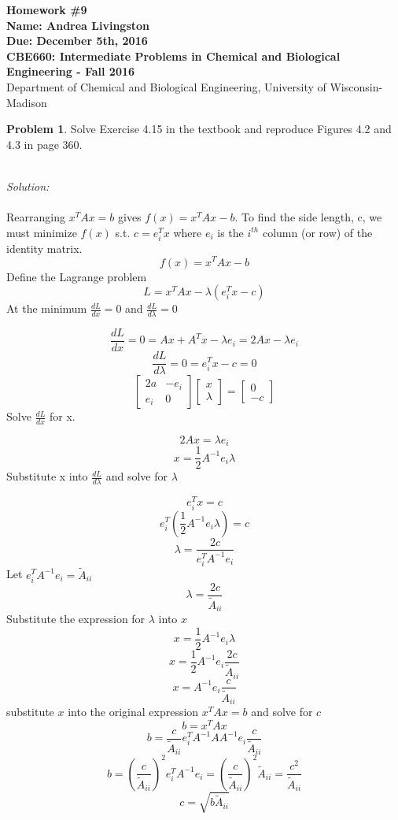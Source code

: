 \documentclass[10pt]{article}
\begin{document}
\begin{center}
{\Large\bf Homework \#9}\\
 {\bf Name: Andrea Livingston}\\
 {\bf Due: December 5th, 2016}\\
 {\bf CBE660: Intermediate Problems in Chemical and Biological
Engineering\; -\; Fall 2016}\\
Department of Chemical and Biological Engineering, University of Wisconsin-Madison
\end{center}

\noindent\colorbox{mygray}{\begin{minipage}{\textwidth}
  {\bf Problem 1}. Solve Exercise 4.15 in the textbook and reproduce Figures 4.2 and 4.3 in page 360.
\end{minipage}}
\\

{\em Solution:}   
\\
\\
Rearranging $x^TAx=b$ gives $f(x)=x^TAx-b$. To find the side length, c, we must minimize $f(x)$ s.t. $c=e_i^Tx$ where $e_i$ is the $i^{th}$ column (or row) of the identity matrix. 
\[ f(x)=x^TAx-b \]
Define the Lagrange problem 
\[ L=x^TAx-\lambda(e_i^Tx-c) \]
At the minimum $\frac{d L}{dx}=0$ and $\frac{d L}{d \lambda}=0$

\[ \frac{d L}{dx}=0=Ax+A^Tx-\lambda e_i = 2Ax-\lambda e_i \]
\[ \frac{d L}{d \lambda}=0=e_i^Tx-c=0 \]
\[ \begin{bmatrix} 2a & -e_i \\ e_i & 0 \end{bmatrix} \begin{bmatrix} x \\ \lambda \end{bmatrix} = \begin{bmatrix} 0 \\ -c \end{bmatrix} \]
Solve $\frac{d L}{dx}$ for x. 

\[ 2Ax=\lambda e_i \]
\[ x=\frac{1}{2}A^{-1}e_i \lambda \]
Substitute x into $\frac{d L}{d \lambda}$ and solve for $\lambda$

\[ e_i^T x=c \]
\[ e_i^T\left( \frac{1}{2}A^{-1}e_i \lambda \right)=c \]
\[ \lambda = \frac{2c}{e_i^T A^{-1}e_i} \]
Let $e_i^T A^{-1}e_i={\widetilde A}_{ii}$
\[\lambda=\frac{2c}{{\widetilde A}_{ii}} \]
Substitute the expression for $\lambda$ into $x$
\[ x=\frac{1}{2}A^{-1}e_i \lambda \]
\[ x=\frac{1}{2}A^{-1}e_i \frac{2c}{{\widetilde A}_{ii}} \]
\[ x=A^{-1}e_i \frac{c}{{\widetilde A}_{ii}} \]
substitute $x$ into the original expression $x^TAx=b$ and solve for $c$
\[ b=x^TAx \]
\[ b = \frac{c}{{\widetilde A}_{ii}} e_i^T A^{-1} A A^{-1}e_i \frac{c}{{\widetilde A}_{ii}} \]
\[ b = \left(\frac{c}{{\widetilde A}_{ii}}\right)^2 e_i^TA^{-1}e_i  = \left(\frac{c}{{\widetilde A}_{ii}}\right)^2 {\widetilde A}_{ii} = \frac{c^2}{{\widetilde A}_{ii}} \]
\[ c=\sqrt{b {\widetilde A}_{ii}} \]
\end{document}
